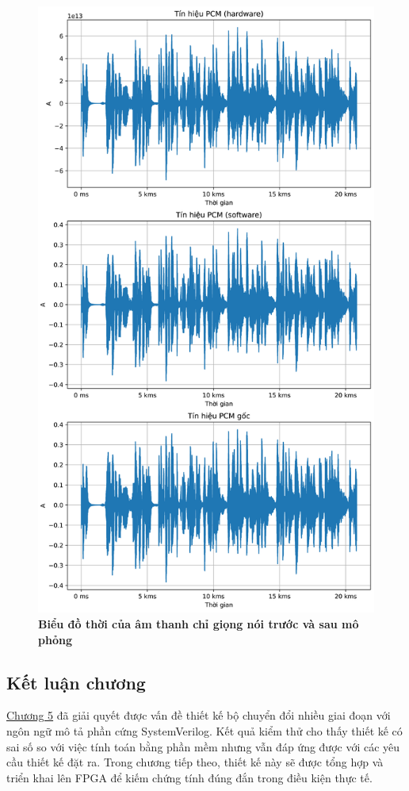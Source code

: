 \begin{figure}[H]
    \centering
    \includegraphics[width=13cm]{Images/Chuong4/tb/wav/vocal.png}
    \caption[Biểu đồ thời gian của âm thanh chỉ giọng nói trước và sau mô phỏng]{\bfseries \fontsize{12pt}{0pt}\selectfont Biểu đồ thời của âm thanh chỉ giọng nói trước và sau mô phỏng}
    \label{vocal}
\end{figure}



\subsection{Kết luận chương}

\hyperref[chuong4]{Chương 5} đã giải quyết được vấn đề thiết kế bộ chuyển đổi nhiều giai đoạn với ngôn ngữ mô tả phần cứng SystemVerilog. Kết quả kiểm thử cho thấy thiết kế có sai số so với việc tính toán bằng phần mềm nhưng vẫn đáp ứng được với các yêu cầu thiết kế đặt ra. Trong chương tiếp theo, thiết kế này sẽ được tổng hợp và triển khai lên FPGA để kiếm chứng tính đúng đắn trong điều kiện thực tế.

\newpage